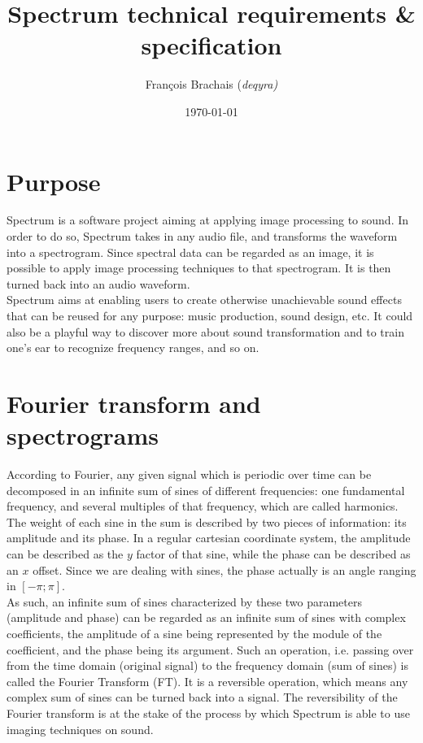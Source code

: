 \documentclass{article}
\title{Spectrum technical requirements \& specification}
\date{\today}
\author{Fran\c{c}ois Brachais (\em{deqyra})}
\begin{document}
\maketitle
{}          %

\newpage
\tableofcontents
{}          %

\newpage
\section{Purpose}
    Spectrum is a software project aiming at applying image processing to sound. In order to do so, Spectrum takes in any audio file, and transforms the waveform into a spectrogram. Since spectral data can be regarded as an image, it is possible to apply image processing techniques to that spectrogram. It is then turned back into an audio waveform.\\\indent
    Spectrum aims at enabling users to create otherwise unachievable sound effects that can be reused for any purpose: music production, sound design, etc. It could also be a playful way to discover more about sound transformation and to train one's ear to recognize frequency ranges, and so on.
            
\section{Fourier transform and spectrograms}
    According to Fourier, any given signal which is periodic over time can be decomposed in an infinite sum of sines of different frequencies: one fundamental frequency, and several multiples of that frequency, which are called harmonics. The weight of each sine in the sum is described by two pieces of information: its amplitude and its phase. In a regular cartesian coordinate system, the amplitude can be described as the $y$ factor of that sine, while the phase can be described as an $x$ offset. Since we are dealing with sines, the phase actually is an angle ranging in $[-\pi ; \pi]$.\\\indent
    As such, an infinite sum of sines characterized by these two parameters (amplitude and phase) can be regarded as an infinite sum of sines with complex coefficients, the amplitude of a sine being represented by the module of the coefficient, and the phase being its argument. Such an operation, i.e. passing over from the time domain (original signal) to the frequency domain (sum of sines) is called the Fourier Transform (FT). It is a reversible operation, which means any complex sum of sines can be turned back into a signal. The reversibility of the Fourier transform is at the stake of the process by which Spectrum is able to use imaging techniques on sound.\\\indent
    
\end{document}
